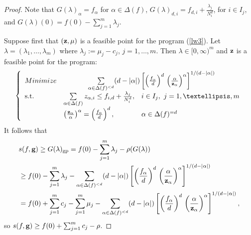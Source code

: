 \documentclass[10pt,a4paper]{amsart}
\begin{document}
\begin{proof} Note that $G(\lambda)_{\alpha} = f_{\alpha}$ for $\alpha \in \Delta(f)$,
$G(\lambda)_{d,i} = f_{d,i}+\frac{\lambda_j}{N_i^d}$, for $i \in I_j$, and $G(\lambda)(0) = f(0)-\sum_{j=1}^m \lambda_j$.

Suppose first that $({\bf z},\mu)$ is a feasible point for the program (\ref{lw3}). Let $\lambda = (\lambda_1,\dots,\lambda_m)$ where $\lambda_j := \mu_j-c_j$, $j=1,\dots,m$. Then $\lambda \in [0,\infty)^m$ and ${\bf z}$ is a feasible point for the program:
\begin{equation}\label{lw'}
\left\{
\begin{array}{lll}
	\textrm{Minimize} & \multicolumn{2}{c}{\sum\limits_{\alpha\in\Delta(f)^{<d}}(d-\vert\alpha\vert)
	 \left[\left(\frac{f_\alpha}{d}\right)^{d}\,\left(\frac{\alpha}{\mathbf{z}_\alpha}\right)^\alpha
	\right]^{1/(d-\vert\alpha\vert)}}\\
	\textrm{\mbox{s.t.}} & \sum\limits_{\alpha\in\Delta(f)}z_{\alpha,i} \le f_{i,d}+\frac{\lambda_j}{N_i^d}, & i  \in I_j, \ j=1,\ldots,m \\
	& \left(\frac{\mathbf{z}_\alpha}{\alpha}\right)^\alpha =\left(\frac{f_\alpha}{d}\right)^{d}, & \alpha\in\Delta(f)^{=d}
\end{array}\right.
\end{equation}
It follows that
\begin{align*}
& s(f,{\bf g}) \ge G(\lambda)_{\operatorname{gp}}  = f(0)- \sum_{j=1}^m \lambda_j - \rho(G(\lambda)) \\ & \ge f(0)- \sum_{j=1}^m \lambda_j - \sum\limits_{\alpha\in\Delta(f)^{<d}}(d-\vert\alpha\vert)\left[
	 \left(\frac{f_\alpha}{d}\right)^{d}\,\left(\frac{\alpha}{\mathbf{z}_\alpha}\right)^\alpha
	\right]^{1/(d-\vert\alpha\vert)} \\ & = f(0)+ \sum_{j=1}^m c_j -\sum_{j=1}^m \mu_j - \sum\limits_{\alpha\in\Delta(f)^{<d}}(d-\vert\alpha\vert)\left[
	 \left(\frac{f_\alpha}{d}\right)^{d}\,\left(\frac{\alpha}{\mathbf{z}_\alpha}\right)^\alpha
	\right]^{1/(d-\vert\alpha\vert)},
\end{align*}
so $s(f,{\bf g}) \ge f(0)+\sum_{j=1}^m c_j -\rho$.


\end{proof}
\end{document}
